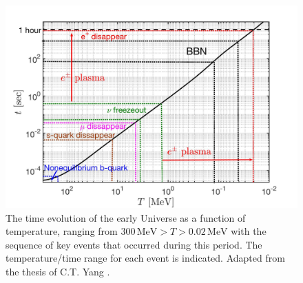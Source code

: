\begin{figure}[ht]
 \centerline{\includegraphics[width=\textwidth,width=\linewidth]{./plots/CosmicTimeTemperature_Project}}
 \caption{
 The time evolution of the early Universe as a function of temperature, ranging from $300\,\mathrm{MeV}>T>0.02\,\mathrm{MeV}$ with the sequence of key events that occurred during this period. The temperature/time range for each event is indicated. Adapted from the thesis of C.T. Yang \cite{Yang:2024ret}.}
 \label{Overview_fig}
\end{figure}

